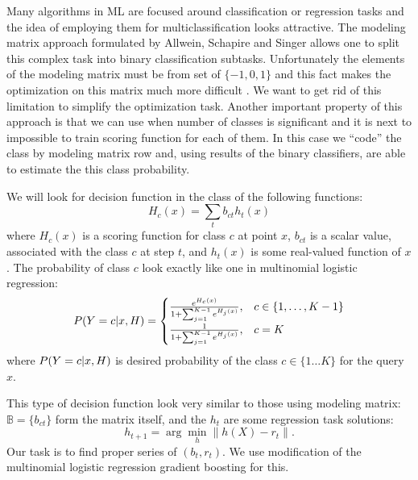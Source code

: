 \documentclass{article}
\begin{document}
Many algorithms in ML are focused around classification or regression tasks and the idea of employing them for multiclassification looks attractive. The modeling matrix approach formulated by Allwein, Schapire and Singer \cite{Allwein00reducingmulticlass} allows one to split this complex task into binary classification subtasks. Unfortunately the elements of the modeling matrix must be from set of $\{-1,0,1\}$ and this fact makes the optimization on this matrix much more difficult \cite{Zhao_sparseoutput, modelmatrix2}. We want to get rid of this limitation to simplify the optimization task. Another important property of this approach is that we can use when number of classes is significant and it is next to impossible to train scoring function for each of them. In this case we ``code'' the class by modeling matrix row and, using results of the binary classifiers, are able to estimate the this class probability.

We will look for decision function in the class of the following functions:
\begin{equation}
H_c(x) = \sum_t b_{ct} h_t(x) 
\end{equation}
where $H_c(x)$ is a scoring function for class $c$ at point $x$, $b_{ct}$ is a scalar value, associated with the class $c$ at step $t$, and $h_t(x)$ is some real-valued function of $x$. The probability of class $c$ look exactly like one in multinomial logistic regression:
\begin{equation}
  P(Y = c \arrowvert x, H) =
  \begin{cases}
    \frac{ e^{H_{c}(x)} }
       { 1+\sum_{j=1}^{K-1} e^{H_{j}(x)} }
    , & c \in \{1, \ldots, K-1 \} \\

    \frac{ 1 }
       { 1 + \sum_{j=1}^{K-1} e^{H_{j}(x)} }
    , & c=K
  \end{cases}\label{eq:MLR_model}
\end{equation}
where $P(Y = c \arrowvert x, H)$ is desired probability of the class $c \in \{1\ldots K\}$ for the query $x$.

This type of decision function look very similar to those using modeling matrix: $\mathbb{B} = \{b_{ct}\}$ form the matrix itself, and the $h_t$ are some regression task solutions:
\begin{equation}
h_{t+1} = \arg \min_h \|h(X) - r_t\|.
\end{equation}
Our task is to find proper series of $(b_t, r_t)$. We use modification of the multinomial logistic regression gradient boosting for this.
\end{document}
